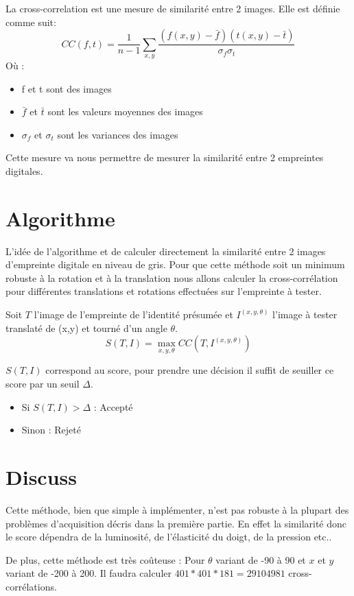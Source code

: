 \documentclass{report}
\begin{document}
La cross-correlation est une mesure de similarité entre 2 images.
Elle est définie comme suit:
$$CC(f,t) = \frac{1}{n-1}\sum_{x,y}\frac{(f(x,y) - \bar{f})(t(x,y) - \bar{t})}{\sigma_f\sigma_t}$$
Où :
\begin{itemize}
  \item f et t sont des images
  \item $\bar{f}$ et $\bar{t}$ sont les valeurs moyennes des images
  \item $\sigma_f$ et $\sigma_t$ sont les variances des images
\end{itemize}
Cette mesure va nous permettre de mesurer la similarité entre 2 empreintes digitales.

\section{Algorithme}

L'idée de l'algorithme et de calculer directement la similarité entre
2 images d'empreinte digitale en niveau de gris. Pour que cette
méthode soit un minimum robuste à la rotation et à la translation nous
allons calculer la cross-corrélation pour différentes translations et
rotations effectuées sur l'empreinte à tester.


Soit $T$ l'image de l'empreinte de l'identité présumée et
$I^{(x,y,\theta)}$ l'image à tester translaté de (x,y) et tourné d'un
angle $\theta$.
$$S(T,I) = \max_{x,y,\theta} CC(T,I^{(x,y,\theta)})$$

$S(T,I)$ correspond au score, pour prendre une décision il suffit de
seuiller ce score par un seuil $\Delta$.
\begin{itemize}
  \item Si $S(T,I) > \Delta$ : Accepté
  \item Sinon : Rejeté
\end{itemize}

\section{Discuss}

Cette méthode, bien que simple à implémenter, n'est pas robuste à la
plupart des problèmes d'acquisition décris dans la première partie. En
effet la similarité donc le score dépendra de la luminosité, de
l'élasticité du doigt, de la pression etc..

De plus, cette méthode est très coûteuse : Pour $\theta$ variant de
-90 à 90 et $x$ et $y$ variant de -200 à 200. Il faudra calculer $401*401*181 = 29104981$ cross-corrélations.
\end{document}
